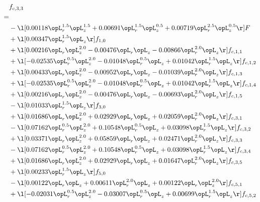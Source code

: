 \begin{alignat}{2} 
\label{eq:f_33_1} 
& f_{c,3,3} \nonumber \\ 
 = \\ 
& - \l[  0.00118 \opL_r^{1.5} \opL_z^{1.5} +  0.00691 \opL_r^{1.5} \opL_z^{0.5} +  0.00719 \opL_r^{2.5} \opL_z^{0.5}  \r] F \nonumber \\ 
& + \l[  0.00347 \opL_r^{1.5} \opL_z  \r] f_{1,0} \nonumber \\ 
& + \l[  0.00216 \opL_r \opL_z^{2.0}   -0.00476 \opL_r \opL_z   -0.00866 \opL_r^{2.0} \opL_z  \r] f_{c,1,1} \nonumber \\ 
& + \l[  -0.02535 \opL_r^{0.5} \opL_z^{2.0}   -0.01048 \opL_r^{0.5} \opL_z +  0.01042 \opL_r^{1.5} \opL_z  \r] f_{c,1,2} \nonumber \\ 
& + \l[  0.00433 \opL_r \opL_z^{2.0}   -0.00952 \opL_r \opL_z   -0.01039 \opL_r^{2.0} \opL_z  \r] f_{c,1,3} \nonumber \\ 
& + \l[  -0.02535 \opL_r^{0.5} \opL_z^{2.0}   -0.01048 \opL_r^{0.5} \opL_z +  0.01042 \opL_r^{1.5} \opL_z  \r] f_{c,1,4} \nonumber \\ 
& + \l[  0.00216 \opL_r \opL_z^{2.0}   -0.00476 \opL_r \opL_z   -0.00693 \opL_r^{2.0} \opL_z  \r] f_{c,1,5} \nonumber \\ 
& - \l[  0.01033 \opL_r^{1.5} \opL_z  \r] f_{3,0} \nonumber \\ 
& + \l[  0.01686 \opL_r \opL_z^{2.0} +  0.02929 \opL_r \opL_z +  0.02059 \opL_r^{2.0} \opL_z  \r] f_{c,3,1} \nonumber \\ 
& - \l[  0.07162 \opL_r^{0.5} \opL_z^{2.0} +  0.10548 \opL_r^{0.5} \opL_z +  0.03098 \opL_r^{1.5} \opL_z  \r] f_{c,3,2} \nonumber \\ 
& + \l[  0.03371 \opL_r \opL_z^{2.0} +  0.05859 \opL_r \opL_z +  0.02471 \opL_r^{2.0} \opL_z  \r] f_{c,3,3} \nonumber \\ 
& - \l[  0.07162 \opL_r^{0.5} \opL_z^{2.0} +  0.10548 \opL_r^{0.5} \opL_z +  0.03098 \opL_r^{1.5} \opL_z  \r] f_{c,3,4} \nonumber \\ 
& + \l[  0.01686 \opL_r \opL_z^{2.0} +  0.02929 \opL_r \opL_z +  0.01647 \opL_r^{2.0} \opL_z  \r] f_{c,3,5} \nonumber \\ 
& + \l[  0.00233 \opL_r^{1.5} \opL_z  \r] f_{5,0} \nonumber \\ 
& - \l[  0.00122 \opL_r \opL_z +  0.00611 \opL_r^{2.0} \opL_z +  0.00122 \opL_r \opL_z^{2.0}  \r] f_{c,5,1} \nonumber \\ 
& + \l[  -0.02031 \opL_r^{0.5} \opL_z^{2.0}   -0.03007 \opL_r^{0.5} \opL_z +  0.00699 \opL_r^{1.5} \opL_z  \r] f_{c,5,2} \nonumber \\ 

\end{alignat}
